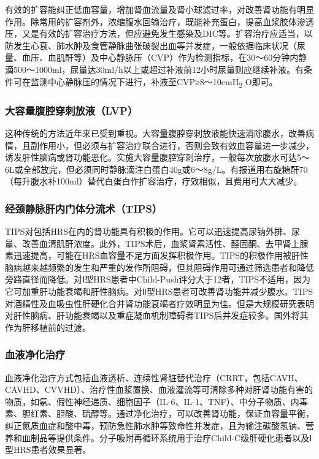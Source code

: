 有效的扩容能纠正低血容量，增加肾血流量及肾小球滤过率，对改善肾功能有明显作用。除常用的扩容剂外，浓缩腹水回输治疗，既能补充蛋白，提高血浆胶体渗透压，又是有效的扩容治疗方法，但应避免发生感染及DIC等。扩容治疗应适当，以防发生心衰、肺水肿及食管静脉曲张破裂出血等并发症，一般依据临床状况（尿量、血压、血肌酐等）及中心静脉压（CVP）作为检测指标，在30～60分钟内静滴500～1000ml，尿量达30ml/h以上或超过补液前12小时尿量则应继续补液。有条件可在监测中心静脉压的情况下进行，补液至CVP≥8～10cmH\textsubscript{2}
O即可。

\subsubsection{大容量腹腔穿刺放液（LVP）}

这种传统的方法近年来已受到重视。大容量腹腔穿刺放液能快速消除腹水，改善病情，且副作用小，但必须与扩容治疗联合进行，否则会致有效血容量进一步减少，诱发肝性脑病或肾功能恶化。实施大容量腹腔穿刺治疗，一般每次放腹水可达5～6L或全部放完，但必须同时静脉滴注白蛋白40g或6～8g/L。有报道用右旋糖酐70（每升腹水补100ml）替代白蛋白作扩容治疗，疗效相似，且费用可大大减少。

\subsubsection{经颈静脉肝内门体分流术（TIPS）}

TIPS对包括HRS在内的肾功能具有积极的作用。它可以迅速提高尿钠外排、尿量、改善血清肌酐浓度。此外，TIPS术后，血浆肾素活性、醛固酮、去甲肾上腺素迅速提高，可能在HRS血容量不足方面发挥积极作用。TIPS的积极作用被肝性脑病越来越频繁的发生和严重的发作所阻碍，但其阻碍作用可通过筛选患者和降低旁路直径而降低。对Ⅰ型HRS患者中Child-Push评分大于12者，TIPS不适用，因为它可加重肝功能衰竭和肝性脑病。对Ⅱ型HRS患者可改善肾功能并减少腹水。TIPS对酒精性及血吸虫性肝硬化合并肾功能衰竭者疗效明显为佳。但是大规模研究表明对肝性脑病、肝功能衰竭以及重症凝血机制障碍者TIPS后并发症较多。国外将其作为肝移植前的过渡。

\subsubsection{血液净化治疗}

血液净化治疗方式包括血液透析、连续性肾脏替代治疗（CRRT，包括CAVH、CAVHD、CVVHD）、治疗性血浆置换、血液灌流等可清除多种对肝肾功能有害的物质，如氨、假性神经递质、细胞因子（IL-6、IL-1、TNF）、中分子物质、内毒素、胆红素、胆酸、硫醇等。通过净化治疗，可以改善肾功能，保证血容量平衡，纠正氮质血症和酸中毒，预防急性肺水肿等致命性并发症，且为输注碳酸氢钠、营养和血制品等提供条件。分子吸附再循环系统用于治疗Child-C级肝硬化患者以及Ⅰ型HRS患者效果显著。

